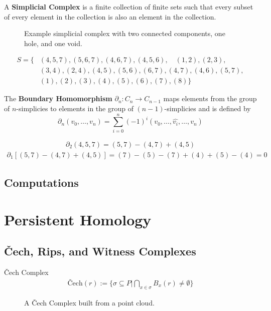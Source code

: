\begin{frame}
	\begin{definition}
		A \textbf{Simplicial Complex} is a finite collection of finite sets such that every subset of every element in the collection is also an element in the collection. \cite{wagner}
	\end{definition}
	\begin{figure}
		
		\caption{Example simplicial complex with two connected components, one hole, and one void.}
	\end{figure}
	\begin{align*}
		S = \{
			&(4,5,7), (5,6,7), (4,6,7), (4,5,6),\quad (1,2), (2,3),\\ &(3,4), (2,4), (4,5), (5,6),(6,7),(4,7),(4,6),(5,7),\\
			&(1), (2), (3), (4), (5), (6), (7), (8)
		\}
	\end{align*}
\end{frame}

\begin{frame}
	\begin{definition}
		The \textbf{Boundary Homomorphism} \(\partial_n : C_n \to C_{n-1}\) maps elements from the group of \(n\)-simplicies to elements in the group of \((n-1)\)-simplicies and is defined by
		\[
			\partial_n (v_0,\dots , v_{n}) = \sum_{i=0}^n (-1)^{i}
			(v_0,\dots, \widehat{v_i}, \dots, v_n)
		\]
		\cite{hatcher}
	\end{definition}
	\begin{align*}
		\partial_2 (4,5,7) = (5,7) - (4,7) + (4,5)
	\end{align*}
	\begin{align*}
		\partial_1 [(5,7) - (4,7) + (4,5)] = (7) - (5) - (7) + (4) + (5) - (4) = 0
	\end{align*}
\end{frame}
\subsection{Computations}
\begin{frame}
\end{frame}


\section[Persistence]{Persistent Homology}
\subsection{\v{C}ech, Rips, and Witness Complexes}
\begin{frame}
	\begin{block}{\v{C}ech Complex}
		\begin{align*}
			\text{\v{C}ech}(r) := \{ \sigma \subseteq P | \bigcap_{x\in \sigma} B_x(r) \neq \emptyset \}
		\end{align*}
		\cite{wagner}
	\end{block}
	\begin{figure}
		
		\caption{A \v{C}ech Complex built from a point cloud.}
	\end{figure}
\end{frame}

